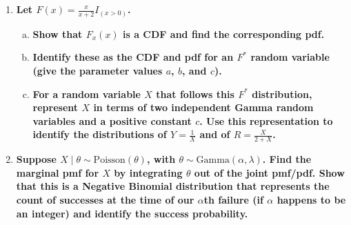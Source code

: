 \documentclass[11pt]{article}
\newenvironment{solution}
  {\renewcommand\qedsymbol{$\blacksquare$}\begin{proof}[Solution]}
  {\end{proof}}
\begin{document}
\begin{enumerate}
\begin{enumerate}[a)]
\begin{solution}
        $f_X(x)$ is maximized when $\ln(f_X(x))$ is maximized. For convenience, let $\ell(x)$ denote $\ln(f_X(x))$. Note that 
        \[
            \ell(x) = \ln(f_X(x)) = \ln \left( \frac{\left( \frac{\alpha}{\mu} \right)^{\alpha} }{\Gamma(\alpha)} \right) + (\alpha - 1) \ln(x) - \left( \frac{\alpha}{\mu} \right)x. 
        \]
        We take the derivative of $\ell(x)$ and set it to $0$ to solve for the maximum:
        \[
            \ell^{\prime}(x) = \frac{\alpha - 1}{x} - \frac{\alpha}{\mu}.
        \]

        Note that $\ell^{\prime}(x) = 0$ when $\frac{\alpha - 1}{x} - \frac{\alpha}{\mu}$. Solving for $x$, we find that $x = \frac{\mu(\alpha - 1)}{\alpha}$. 
        \end{solution}


        \item \textbf{Let $Y = \frac{1}{X}$, so that $Y$ follows a reciprocal-Gamma$\left( \alpha, \frac{\alpha}{u} \right)$ distribution. Find the pdf for $Y$,
        and identify its mode as a function of $\alpha$ and $u$.}
    \end{enumerate}

    \item \textbf{Let $F(x) = \frac{x}{x+2} I_{(x > 0)}$.}
    
    \begin{enumerate}[a)]
        \item \textbf{Show that $F_x(x)$ is a CDF and find the corresponding pdf.}
        \item \textbf{Identify these as the CDF and pdf for an $F^*$ random variable (give the parameter values $a$, $b$, and $c$).}
        \item \textbf{For a random variable $X$ that follows this $F^*$ distribution, represent $X$ in terms of two independent Gamma random variables and a positive constant $c$.
        Use this representation to identify the distributions of $Y = \frac{1}{X}$ and of $R = \frac{X}{2+X}$.}
    \end{enumerate}

    \item \textbf{Suppose $X \mid \theta \sim \mathrm{Poisson}(\theta)$, with $\theta \sim \mathrm{Gamma}(\alpha, \lambda)$. Find the marginal pmf for $X$ by integrating $\theta$ out of the joint pmf/pdf.
    Show that this is a Negative Binomial distribution that represents the count of successes at the time 
    of our $\alpha$th failure (if $\alpha$ happens to be an integer) and identify the success probability.}


\end{enumerate}
\end{document}
